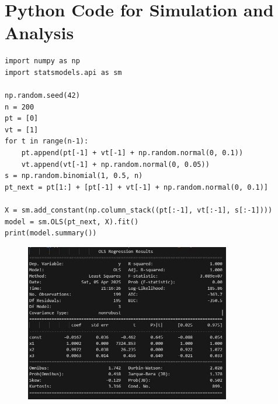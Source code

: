 \documentclass[12pt]{article}
\begin{document}
\section{Python Code for Simulation and Analysis}
\label{app:code}

\begin{lstlisting}
import numpy as np
import statsmodels.api as sm

np.random.seed(42)
n = 200
pt = [0]
vt = [1]
for t in range(n-1):
    pt.append(pt[-1] + vt[-1] + np.random.normal(0, 0.1))
    vt.append(vt[-1] + np.random.normal(0, 0.05))
s = np.random.binomial(1, 0.5, n)
pt_next = pt[1:] + [pt[-1] + vt[-1] + np.random.normal(0, 0.1)]

X = sm.add_constant(np.column_stack((pt[:-1], vt[:-1], s[:-1])))
model = sm.OLS(pt_next, X).fit()
print(model.summary())
\end{lstlisting}

\begin{figure}[h]
    \centering
    \includegraphics[width=0.8\textwidth]{pystat_regression_data.JPG}
\end{figure}
\end{document}
